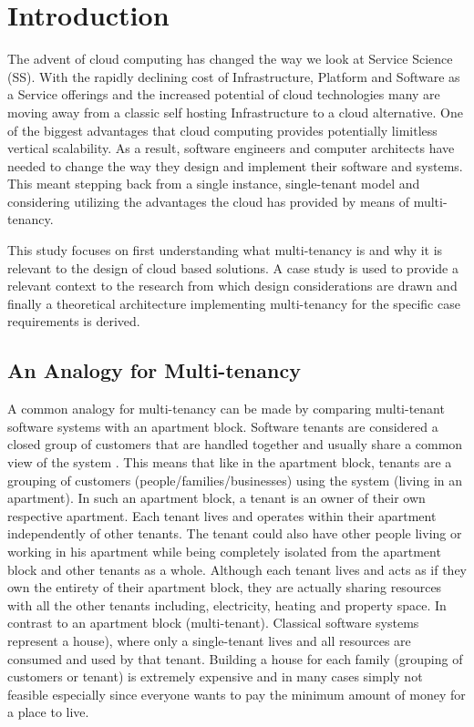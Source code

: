 \chapter{Introduction}
The advent of cloud computing has changed the way we look at Service Science (SS). With the rapidly declining cost of Infrastructure, Platform and Software as a Service offerings and the increased potential of cloud technologies many are moving away from a classic self hosting Infrastructure to a cloud alternative. One of the biggest advantages that cloud computing provides potentially limitless vertical scalability. As a result, software engineers and computer architects have needed to change the way they design and implement their software and systems. This meant stepping back from a single instance, single-tenant model and considering utilizing the advantages the cloud has provided by means of multi-tenancy.
 
This study focuses on first understanding what multi-tenancy is and why it is relevant to the design of cloud based solutions. A case study is used to provide a relevant context to the research from which design considerations are drawn and finally a theoretical architecture implementing multi-tenancy for the specific case requirements is derived.

\section{An Analogy for Multi-tenancy}
A common analogy for multi-tenancy can be made by comparing multi-tenant software systems with an apartment block. Software tenants are considered a closed group of customers that are handled together and usually share a common view of the system \cite{Krebs2012} \cite{Wilder}. This means that like in the apartment block, tenants are a grouping of customers (people/families/businesses) using the system (living in an apartment). In such an apartment block, a tenant is an owner of their own respective apartment. Each tenant lives and operates within their apartment independently of other tenants. The tenant could also have other people living or working in his apartment while being completely isolated from the apartment block and other tenants as a whole. Although each tenant lives and acts as if they own the entirety of their apartment block, they are actually sharing resources with all the other tenants including, electricity, heating and property space. In contrast to an apartment block (multi-tenant). Classical software systems represent a house), where only a single-tenant lives and all resources are consumed and used by that tenant. Building a house for each family (grouping of customers or tenant) is extremely expensive and in many cases simply not feasible especially since everyone wants to pay the minimum amount of money for a place to live.
 


